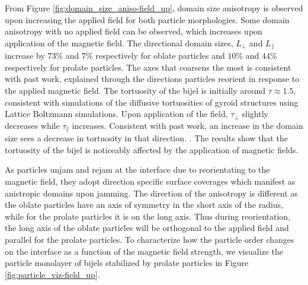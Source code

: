 From Figure \ref{fig:domain_size_aniso-field_up}, domain
size anisotropy is observed upon increasing the applied field
for both particle morphologies. Some domain anisotropy with no applied field can be observed, 
which increases upon application of the magnetic field. The directional domain sizes,
$L_{\perp}$ and $L_{\parallel}$ increase by $73\%$ and $7\%$
respectively for oblate particles and $10\%$ and $44\%$ respectively
for prolate particles. The axes that coarsens the most is consistent
with past work, explained through the directions particles reorient in
response to the applied magnetic field. The
tortuosity of the bijel is initially around $\tau \approx 1.5$,
consistent with simulations of the diffusive tortuosities of gyroid
structures using Lattice Boltzmann simulations.
\cite{luo_macroscopic_2020} Upon application of the field,
$\tau_{\perp}$ slightly decreases while $\tau_{\parallel}$
increases. Consistent with past work, an increase in the domain size sees a decrease in
tortuosity in that direction. \cite{karthikeyan_formation_2024}. The results show that the
tortuosity of the bijel is noticeably affected by the application of
magnetic fields.

As particles unjam and rejam at the interface due to reorientating to
the magnetic field, they adopt direction specific surface coverages
which manifest as anistropic domains upon jamming. The direction of the
anisotropy is different as the oblate particles have an axis of symmetry
in the short axis of the radius, while for the prolate particles it is
on the long axis. Thus during reorientation, the long axis of the oblate
particles will be orthogonal to the applied field and parallel for the
prolate particles. To characterize how the particle order changes on the
interface as a function of the magnetic field strength, we visualize the
particle monolayer of bijels stabilized by prolate particles in Figure
\ref{fig:particle_viz-field_up}.


